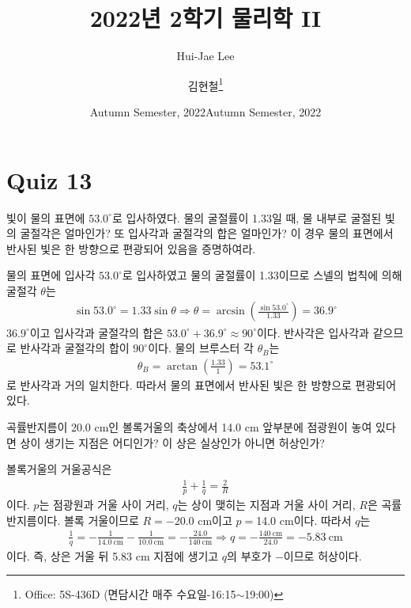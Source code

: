 \documentclass[tightenlines,floatfix,nofootinbib,superscriptaddress,fleqn]{revtex4-2}
\begin{document}
\title{\Large 2022년 2학기 물리학 II}
\author{Hui-Jae Lee} 
\date{Autumn Semester, 2022}
\author{김현철\footnote{Office: 5S-436D (면담시간 매주
    수요일-16:15$\sim$19:00)}} 
\date{Autumn Semester, 2022}

\maketitle


\section*{\large Quiz 13}
빛이 물의 표면에 $53.0^\circ$로 입사하였다. 물의 굴절률이 1.33일 때, 물
내부로 굴절된 빛의 굴절각은 얼마인가? 또 입사각과 굴절각의 합은
얼마인가? 이 경우 물의 표면에서 반사된 빛은 한 방향으로 편광되어
있음을 증명하여라. 

물의 표면에 입사각 $53.0^\circ$로 입사하였고 물의 굴절률이 1.33이므로 스넬의 법칙에 의해
굴절각 $\theta$는
\begin{align}
  \sin 53.0^\circ = 1.33\sin\theta \Longrightarrow
  \theta = \arcsin\left(\frac{\sin 53.0^\circ}{1.33}\right)=36.9^\circ
\end{align}
$36.9^\circ$이고 입사각과 굴절각의 합은 $53.0^\circ+36.9^\circ\approx 90^\circ$이다.
반사각은 입사각과 같으므로 반사각과 굴절각의 합이 $90^\circ$이다. 물의 브루스터 각 $\theta_B$는
\begin{align}
  \theta_B = \arctan\left(\frac{1.33}{1}\right)
  =53.1^\circ
\end{align}
로 반사각과 거의 일치한다. 따라서 물의 표면에서 반사된 빛은 한 방향으로 편광되어 있다.
\vspace{1cm}

곡률반지름이 20.0 cm인 볼록거울의 축상에서 14.0 cm 앞부분에 점광원이
놓여 있다면 상이 생기는 지점은 어디인가? 이 상은 실상인가 아니면 허상인가?

볼록거울의 거울공식은
\begin{align}
  \frac{1}{p} + \frac{1}{q} = \frac{2}{R}
\end{align}
이다. $p$는 점광원과 거울 사이 거리, $q$는 상이 맺히는 지점과 거울 사이 거리, 
$R$은 곡률 반지름이다. 볼록 거울이므로 $R =-$20.0 cm이고 $p=$14.0 cm이다. 따라서 $q$는
\begin{align}
  \frac{1}{q} = -\frac{1}{14.0~\mathrm{cm}} -\frac{1}{10.0~\mathrm{cm}}
  = -\frac{24.0}{140~\mathrm{cm}} \Longrightarrow
  q = -\frac{140~\mathrm{cm}}{24.0} = -5.83~\mathrm{cm}
\end{align}
이다. 즉, 상은 거울 뒤 5.83 cm 지점에 생기고 $q$의 부호가 $-$이므로 허상이다.
\vspace{1cm}
\end{document}
